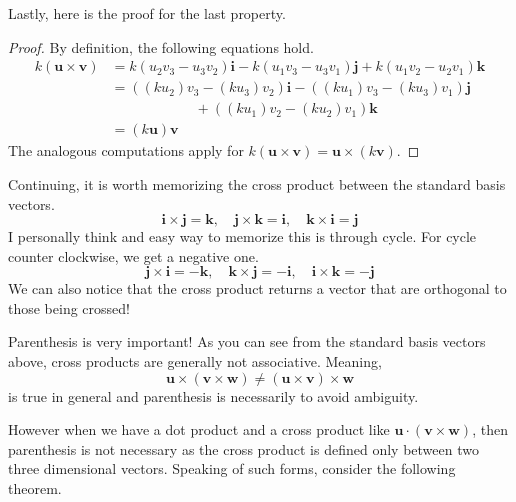 \documentclass[../../main.tex]{subfiles}
\begin{document}
Lastly, here is the proof for the last property.

\begin{proof}
By definition, the following equations hold.
\begin{align*}
    k (\mathbf{u} \times \mathbf{v})
    &= k(u_2v_3 - u_3v_2) \mathbf{i} - k(u_1v_3 - u_3v_1) \mathbf{j}
        + k(u_1v_2 - u_2v_1) \mathbf{k} \\
    &= ((ku_2)v_3 - (ku_3)v_2) \mathbf{i}
        - ((ku_1)v_3 - (ku_3)v_1) \mathbf{j} \\
        &\qquad\qquad\qquad + ((ku_1)v_2 - (ku_2)v_1) \mathbf{k} \\
    &= (k\mathbf{u}) \mathbf{v}
\end{align*}
The analogous computations apply for $k (\mathbf{u} \times \mathbf{v})
= \mathbf{u} \times (k\mathbf{v})$.
\end{proof}

Continuing, it is worth memorizing the cross product between the
standard basis vectors.
\[
\mathbf{i} \times \mathbf{j} = \mathbf{k}, \quad
\mathbf{j} \times \mathbf{k} = \mathbf{i}, \quad
\mathbf{k} \times \mathbf{i} = \mathbf{j}
\]
I personally think and easy way to memorize this is through cycle.
For cycle counter clockwise, we get a negative one.
\[
\mathbf{j} \times \mathbf{i} = -\mathbf{k}, \quad
\mathbf{k} \times \mathbf{j} = -\mathbf{i}, \quad
\mathbf{i} \times \mathbf{k} = -\mathbf{j}
\]
We can also notice that the cross product returns a vector
that are orthogonal to those being crossed!

\begin{important}
Parenthesis is very important! As you can see from the standard
basis vectors above, cross products are generally not associative.
Meaning,
\[
\mathbf{u} \times (\mathbf{v} \times \mathbf{w})
\neq (\mathbf{u} \times \mathbf{v}) \times \mathbf{w}
\]
is true in general and parenthesis is necessarily to avoid ambiguity.
\end{important}

However when we have a dot product and a cross product like
$\mathbf{u} \cdot (\mathbf{v} \times \mathbf{w})$, then parenthesis
is not necessary as the cross product is defined only between two
three dimensional vectors. Speaking of such forms, consider the
following theorem.
\end{document}
